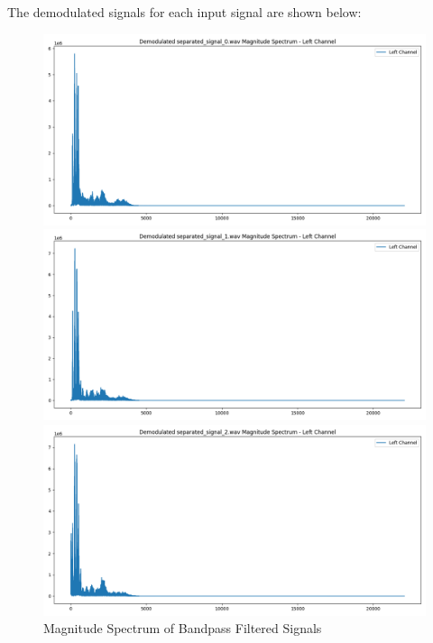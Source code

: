 \documentclass[12pt,a4paper]{article}
\begin{document}
The demodulated signals for each input signal are shown below:
\begin{figure}[H]
    \centering
    \begin{minipage}{0.29\textwidth}
        \centering
        \includegraphics[width=\textwidth]{../data/demodulated/signals_after_demodulation_spectrum/out0.png}
    \end{minipage} \hfill
    \begin{minipage}{0.29\textwidth}
        \centering
        \includegraphics[width=\textwidth]{../data/demodulated/signals_after_demodulation_spectrum/out1.png}
    \end{minipage} \hfill
    \begin{minipage}{0.29\textwidth}
        \centering
        \includegraphics[width=\textwidth]{../data/demodulated/signals_after_demodulation_spectrum/out2.png}
    \end{minipage}
    \caption{Magnitude Spectrum of Bandpass Filtered Signals}
\end{figure}
\end{document}
